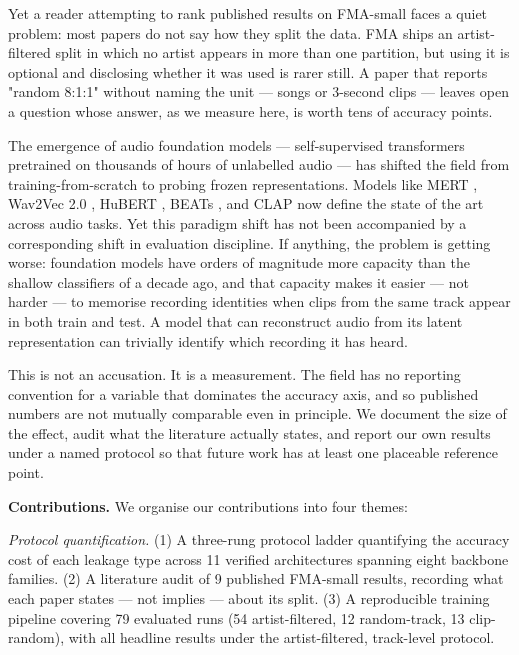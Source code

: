 \documentclass[conference]{IEEEtran}
\begin{document}
Yet a reader attempting to rank published results on FMA-small faces a
quiet problem: most papers do not say how they split the data. FMA ships
an artist-filtered split in which no artist appears in more than one
partition, but using it is optional and disclosing whether it was used
is rarer still. A paper that reports "random 8:1:1" without naming the
unit --- songs or 3-second clips --- leaves open a question
whose answer, as we measure here, is worth tens of accuracy points.

The emergence of audio foundation models --- self-supervised
transformers pretrained on thousands of hours of unlabelled audio
--- has shifted the field from training-from-scratch to probing
frozen representations. Models like MERT \citep{li2023mert}, Wav2Vec 2.0
\citep{baevski2020wav2vec}, HuBERT \citep{hsu2021hubert}, BEATs
\citep{chen2023beats}, and CLAP \citep{wu2023clap} now define the state
of the art across audio tasks. Yet this paradigm shift has not been
accompanied by a corresponding shift in evaluation discipline. If
anything, the problem is getting worse: foundation models have orders of
magnitude more capacity than the shallow classifiers of a decade ago,
and that capacity makes it easier --- not harder --- to memorise
recording identities when clips from the same track appear in both train
and test. A model that can reconstruct audio from its latent
representation can trivially identify which recording it has heard.

This is not an accusation. It is a measurement. The field has no
reporting convention for a variable that dominates the accuracy axis,
and so published numbers are not mutually comparable even in principle.
We document the size of the effect, audit what the literature actually
states, and report our own results under a named protocol so that future
work has at least one placeable reference point.

\textbf{Contributions.} We organise our contributions into four themes:

\emph{Protocol quantification.} (1) A three-rung protocol ladder
quantifying the accuracy cost of each leakage type across 11 verified
architectures spanning eight backbone families. (2) A literature audit
of 9 published FMA-small results, recording what each paper states
--- not implies --- about its split. (3) A reproducible training
pipeline covering 79 evaluated runs (54 artist-filtered, 12
random-track, 13 clip-random), with all headline results under the
artist-filtered, track-level protocol.
\end{document}
